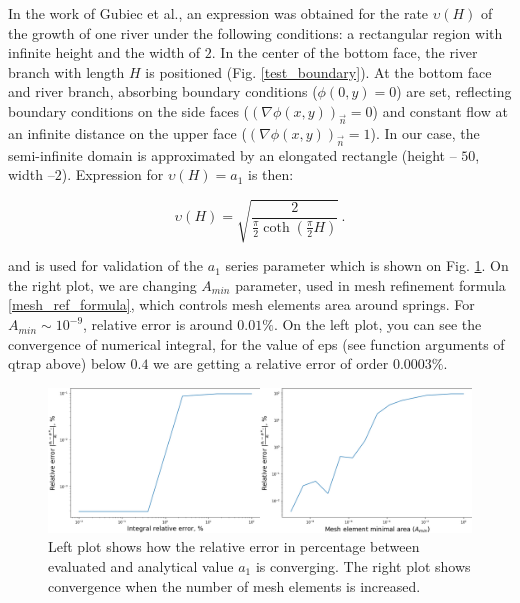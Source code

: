 \documentclass[]{pracamgr}
\begin{document}
      In the work of Gubiec et al.\cite{gubiec2008fingered}, an expression was obtained for the rate $\upsilon(H)$ of the growth of one river under the following conditions: a rectangular region with infinite height and the width of $2$. In the center of the bottom face, the river branch with length $H$ is positioned (Fig. \ref{test_boundary}). At the bottom face and river branch, absorbing boundary conditions ($\phi(0, y) = 0$) are set, reflecting boundary conditions on the side faces ($(\nabla \phi(x, y))_{ \vec{n}} = 0$) and constant flow at an infinite distance on the upper face ($(\nabla \phi(x, y))_{\vec{n}} = 1$). In our case, the semi-infinite domain is approximated by an elongated rectangle (height -- $50$, width --$2$). Expression for $\upsilon(H) = a_1$ is then:

      \begin{equation}
        \label{velocity_analytical}
        \upsilon(H) = \sqrt{\frac{2}{\frac{\pi}{2}\coth(\frac{\pi}{2}H)}} \,.
      \end{equation} 
      
      \noindent and is used for validation of the $a_1$ series parameter which is shown on Fig. \ref{convergence_new}. On the right plot, we are changing $A_{min}$ parameter, used in mesh refinement formula \ref{mesh_ref_formula}, which controls mesh elements area around springs. For $A_{min} \sim 10^{-9}$, relative error is around $0.01\%$. On the left plot, you can see the convergence of numerical integral, for the value of eps (see function arguments of qtrap above) below $0.4$ we are getting a relative error of order $0.0003\%$.

      \begin{figure}[H]
        \centering
        \includegraphics[width=1\textwidth]{figs/convergence.png}        
        \caption{Left plot shows how the relative error in percentage between evaluated and analytical value $a_1$ is converging. The right plot shows convergence when the number of mesh elements is increased.}
        \label{convergence_new}
      \end{figure}
\end{document}
